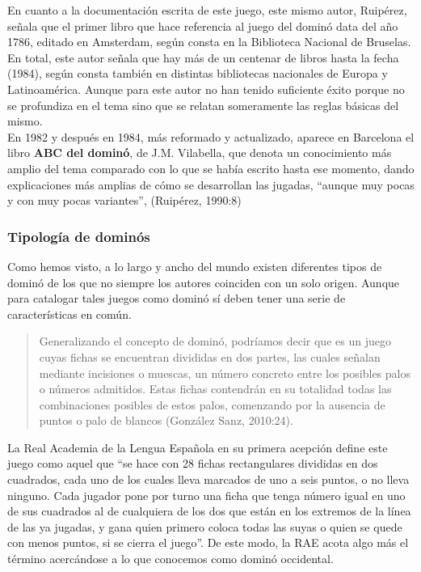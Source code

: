 En cuanto a la documentación escrita de este juego, este mismo autor, Ruipérez, señala que el primer
libro que hace referencia al juego del dominó data del año 1786, editado en Amsterdam, según consta
en la Biblioteca Nacional de Bruselas. En total, este autor señala que hay más de un centenar de
libros hasta la fecha (1984), según consta también en distintas bibliotecas nacionales de Europa y
Latinoamérica. Aunque para este autor no han tenido suficiente éxito porque no se profundiza en
el tema sino que se relatan someramente las reglas básicas del mismo. \\

En 1982 y después en 1984, más reformado y actualizado, aparece en Barcelona el libro \textbf{ABC del dominó},
de J.M. Vilabella, que denota un conocimiento más amplio del tema comparado con lo que se había
escrito hasta ese momento, dando explicaciones más amplias de cómo se desarrollan las jugadas,
“aunque muy pocas y con muy pocas variantes”, (Ruipérez, 1990:8)

\subsubsection{Tipología de dominós}

Como hemos visto, a lo largo y ancho del mundo existen diferentes tipos de dominó de los que no
siempre los autores coinciden con un solo origen. Aunque para catalogar tales juegos como dominó sí
deben tener una serie de características en común. 

\begin{quote}
Generalizando el concepto de dominó, podríamos decir que es un juego cuyas fichas se encuentran
divididas en dos partes, las cuales señalan mediante incisiones o muescas, un número concreto entre
los posibles palos o números admitidos. Estas fichas contendrán en su totalidad todas las
combinaciones posibles de estos palos, comenzando por la ausencia de puntos o palo de blancos
(González Sanz, 2010:24).
\end{quote}

La Real Academia de la Lengua Española en su primera acepción define este juego como aquel que
“se hace con 28 fichas rectangulares divididas en dos cuadrados, cada uno de los cuales lleva marcados
de uno a seis puntos, o no lleva ninguno. Cada jugador pone por turno una ficha que tenga número
igual en uno de sus cuadrados al de cualquiera de los dos que están en los extremos de la línea de
las ya jugadas, y gana quien primero coloca todas las suyas o quien se quede con menos puntos, si
se cierra el juego”. De este modo, la RAE acota algo más el término acercándose a lo que conocemos
como dominó occidental. \\

